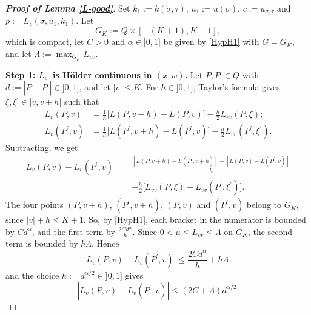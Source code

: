 \documentclass[reqno,12pt]{amsart}
\numberwithin{equation}{section}
\theoremstyle{remark}
\begin{document}
\begin{proof}[\bf Proof of Lemma \ref{L-good}]
Set $k_1:=k(\sigma,\tau)$, $u_1:=u(\sigma)$, $c:=u_{\sigma,\tau}$ and $\bar p:=L_v(\sigma,u_1,k_1)$. Let
\begin{equation*}
G_K:=Q\times[-(K+1),K+1],
\end{equation*}
which is compact, let $C>0$ and $\alpha\in]0,1]$ be given by \ref{HypH1} with $G=G_K$, and let $\Lambda:=\max_{G_K}L_{vv}$.

\medskip

{\bf Step 1: \boldmath$L_v$\unboldmath\  is H\"older continuous in \boldmath$(x,w)$\unboldmath.} Let $P,P^\prime\in Q$ with $d:=|P-P^\prime|\in]0,1]$, and let $|v|\leq K$. For $h\in]0,1]$, Taylor's formula gives $\xi,\xi^\prime\in]v,v+h[$ such that
\begin{align*}
L_v(P,v)&=\frac1h\big[L(P,v+h)-L(P,v)\big]-\frac h2L_{vv}(P,\xi);\\
L_v(P^\prime,v)&=\frac1h\big[L(P^\prime,v+h)-L(P^\prime,v)\big]-\frac h2L_{vv}(P^\prime,\xi^\prime).
\end{align*}
Subtracting, we get
\begin{align*}
L_v(P,v)-L_v(P^\prime,v)={}&\frac{[L(P,v+h)-L(P^\prime,v+h)]-[L(P,v)-L(P^\prime,v)]}{h}\\
&-\frac h2\big[L_{vv}(P,\xi)-L_{vv}(P^\prime,\xi^\prime)\big].
\end{align*}
The four points $(P,v+h)$, $(P^\prime,v+h)$, $(P,v)$ and $(P^\prime,v)$ belong to $G_K$, since $|v|+h\leq K+1$. So, by \ref{HypH1}, each bracket in the numerator is bounded by $Cd^\alpha$, and the first term by $\frac{2Cd^\alpha}h$. Since $0<\mu\leq L_{vv}\leq\Lambda$ on $G_K$, the second term is bounded by $h\Lambda$. Hence 
\begin{equation*}
|L_v(P,v)-L_v(P^\prime,v)|\leq\frac{2Cd^\alpha}{h}+h\Lambda,
\end{equation*}
and the choice $h:=d^{\alpha/2}\in]0,1]$ gives
\begin{equation}\label{Lv}
|L_v(P,v)-L_v(P^\prime,v)|\leq(2C+\Lambda)d^{\alpha/2}.
\end{equation}

\medskip


\end{proof}
\end{document}
